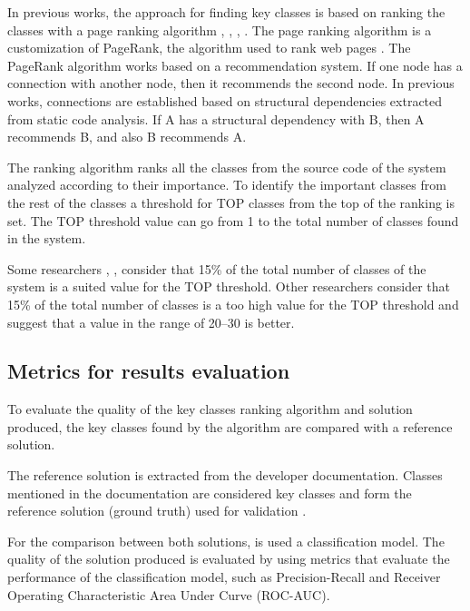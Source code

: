 \documentclass[12pt]{mitthesis}
\begin{document}
In previous works, the approach for finding key classes is based on ranking the classes with a page ranking algorithm \cite{PagerankENASE}, \cite{enase15}, \cite{Finding-key-classes}, \cite{PagerankSACI} . The page ranking algorithm is a customization of PageRank, the algorithm used to rank web pages \cite{ilprints422}. 
The PageRank algorithm works based on a recommendation system. If one node has a connection with another node, then it recommends the second node. In previous works, connections are established based on structural dependencies extracted from static code analysis. If A has a structural dependency with B, then A recommends B, and also B recommends A. 

The ranking algorithm ranks all the classes from the source code of the system analyzed according to their importance. To identify the important classes from the rest of the classes a threshold for TOP classes from the top of the ranking is set. The TOP threshold value can go from 1 to the total number of classes found in the system. 

Some researchers \cite{ZaidmanJurnal}, \cite{Ding2016AnIA}, \cite{PAN2018188} consider that 15\% of the total number of classes of the system is a suited value for the TOP threshold. Other researchers \cite{Finding-key-classes} consider that 15\% of the total number of classes is a too high value for the TOP threshold and suggest that a value in the range of 20–30 is better.


\subsection{Metrics for results evaluation}
\label{sec:evalmetrics}
To evaluate the quality of the key classes ranking algorithm and solution produced, the key classes found by the algorithm are compared with a reference solution.

The reference solution is extracted from the developer documentation.  Classes mentioned in the documentation are considered key classes and form the reference solution (ground truth) used for validation \cite{7551990}. 


For the comparison between both solutions, is used a classification model. The quality of the solution produced is evaluated by using metrics that evaluate the performance of the classification model, such as Precision-Recall and Receiver Operating Characteristic Area Under Curve (ROC-AUC).
\end{document}
